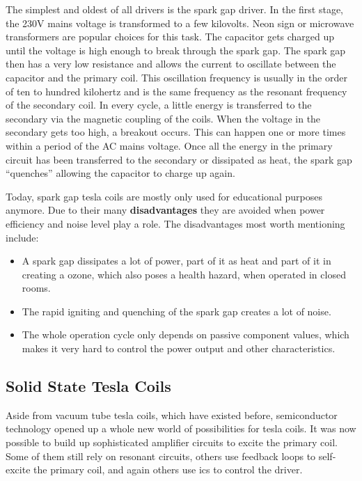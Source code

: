 The simplest and oldest of all drivers is the spark gap driver. In the first stage, the 230V mains voltage is transformed to a few kilovolts. Neon sign or microwave transformers are popular choices for this task. The capacitor gets charged up until the voltage is high enough to break through the spark gap. The spark gap then has a very low resistance and allows the current to oscillate between the capacitor and the primary coil. This oscillation frequency is usually in the order of ten to hundred kilohertz and is the same frequency as the resonant frequency of the secondary coil. In every cycle, a little energy is transferred to the secondary via the magnetic coupling of the coils. When the voltage in the secondary gets too high, a breakout occurs. This can happen one or more times within a period of the AC mains voltage. Once all the energy in the primary circuit has been transferred to the secondary or dissipated as heat, the spark gap \enquote{quenches} allowing the capacitor to charge up again.

Today, spark gap tesla coils are mostly only used for educational purposes anymore. Due to their many \textbf{disadvantages} they are avoided when power efficiency and noise level play a role. The disadvantages most worth mentioning include:

\begin{itemize}
\item A spark gap dissipates a lot of power, part of it as heat and part of it in creating a ozone, which also poses a health hazard, when operated in closed rooms.
\item The rapid igniting and quenching of the spark gap creates a lot of noise.
\item The whole operation cycle only depends on passive component values, which makes it very hard to control the power output and other characteristics.
\end{itemize}

\subsection{Solid State Tesla Coils}

Aside from vacuum tube tesla coils, which have existed before, semiconductor technology opened up a whole new world of possibilities for tesla coils. It was now possible to build up sophisticated amplifier circuits to excite the primary coil. Some of them still rely on resonant circuits, others use feedback loops to self-excite the primary coil, and again others use \glspl{ic} to control the driver.


